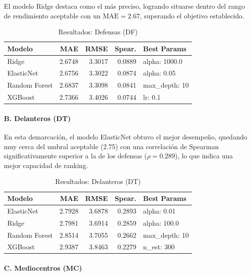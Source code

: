 El modelo Ridge destaca como el más preciso, logrando situarse 
dentro del rango de rendimiento aceptable con un 
$\mathrm{MAE} = 2.67$, superando el objetivo establecido.

\begin{table}[H]
\centering
\small
\begin{tabular}{|l|r|r|r|p{3cm}|}
\hline
\textbf{Modelo} & \textbf{MAE} & \textbf{RMSE} & \textbf{Spear.} & 
\textbf{Best Params} \\
\hline
Ridge & 2.6748 & 3.3017 & 0.0889 & alpha:
1000.0 \\
ElasticNet & 2.6756 & 3.3022 & 0.0874 & alpha: 0.05 \\
Random Forest & 2.6837 & 3.3098 & 0.0841 & max\_depth: 10 \\
XGBoost & 2.7366 & 3.4026 & 0.0744 & lr: 0.1 \\
\hline
\end{tabular}
\caption{Resultados: Defensas (DF)}
\end{table}


\paragraph{B. Delanteros (DT)}

En esta demarcación, el modelo ElasticNet obtuvo el mejor 
desempeño, quedando muy cerca del umbral aceptable (2.75) con una 
correlación de Spearman significativamente superior a la de los 
defensas ($\rho = 0.289$), lo que indica una mejor capacidad de 
ranking.

\begin{table}[H]
\centering
\small
\begin{tabular}{|l|r|r|r|p{3cm}|}
\hline
\textbf{Modelo} & \textbf{MAE} & \textbf{RMSE} & \textbf{Spear.} & 
\textbf{Best Params} \\
\hline
ElasticNet & 2.7928 & 3.6878 & 0.2893 & alpha: 0.01 \\
Ridge & 2.7981 & 3.6914 & 0.2859 & alpha: 100.0 \\
Random Forest & 2.8514 & 3.7055 & 0.2662 & max\_depth: 10 \\
XGBoost & 2.9387 & 3.8463 & 0.2279 & n\_est: 300 \\
\hline
\end{tabular}
\caption{Resultados: Delanteros (DT)}
\end{table}


\paragraph{C. Mediocentros (MC)}

